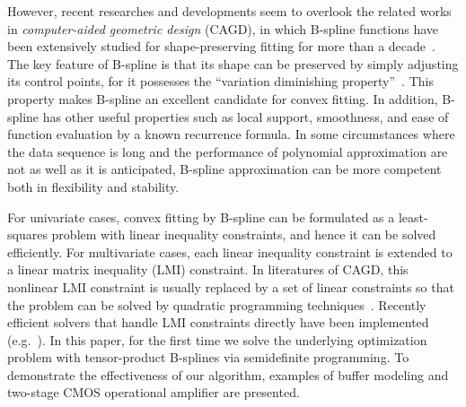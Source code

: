\documentclass{sig-alternate}
\begin{document}

However, recent researches and developments seem to overlook the related works in
{\it computer-aided geometric design} (CAGD), in which B-spline functions have
been extensively studied for shape-preserving fitting for more than a
decade~\cite{Farin88}. 
The key feature of B-spline is that its shape can be preserved by
simply adjusting its control points, for it possesses the ``variation diminishing
property''~\cite{GMP_03}. This property makes B-spline an excellent
candidate for convex fitting. 
In addition, B-spline has other useful properties such as local
support, smoothness, and ease of function
evaluation by a known recurrence formula. In some circumstances 
where the data sequence is long and the performance of polynomial
approximation are not as well as it is anticipated, B-spline
approximation can be more competent both in flexibility and stability. 

For univariate cases, convex fitting by
B-spline can be formulated as a least-squares problem with linear
inequality constraints, and hence it can be solved efficiently. For
multivariate cases, each linear inequality constraint is extended to
a linear matrix inequality (LMI) constraint. 
In literatures of CAGD, this nonlinear LMI constraint is usually replaced by a
set of linear constraints so that the problem can be solved by
quadratic programming techniques~\cite{Kuijt_Damme_01}. Recently efficient
solvers that handle LMI constraints directly have been
implemented (e.g.~\cite{cvx_pack}). 
In this paper, for the first time we solve the underlying optimization
problem with tensor-product B-splines via semidefinite programming. 
To demonstrate the effectiveness of our
algorithm, examples of buffer modeling and two-stage CMOS operational
amplifier are presented. 
\end{document}
